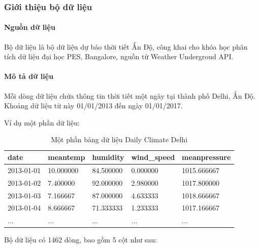 \subsubsection{Giới thiệu bộ dữ liệu}
    \paragraph{Nguồn dữ liệu}
    \leavevmode

    Bộ dữ liệu là bộ dữ liệu dự báo thời tiết Ấn Độ, công khai cho khóa học phân tích dữ liệu đại học PES, Bangalore, nguồn từ Weather Undergroud API. 

    \paragraph{Mô tả dữ liệu}
    \leavevmode
    Mỗi dòng dữ liệu chứa thông tin thời tiết một ngày tại thành phố Delhi, Ấn Độ. Khoảng dữ liệu từ này 01/01/2013 đến ngày 01/01/2017.

    Ví dụ một phần dữ liệu:

    \begin{table}[htbp]
    \centering
    \caption{Một phần bảng dữ liệu Daily Climate Delhi}
    \label{tab:stat-weather-exp}
        \begin{tabular}{|p{2cm}|p{2cm}|p{2cm}|p{2.3cm}|p{3cm}|}
        \hline
        date & meantemp & humidity & wind\_speed & meanpressure \\
        \hline
        2013-01-01 & 10.000000 & 84.500000 & 0.000000 & 1015.666667 \\
        \hline
        2013-01-02 & 7.400000 & 92.000000 & 2.980000 & 1017.800000 \\
        \hline
        2013-01-03 & 7.166667 & 87.000000 & 4.633333 & 1018.666667 \\
        \hline
        2013-01-04 & 8.666667 & 71.333333 & 1.233333 & 1017.166667 \\
        \hline
        ... & ... & ... & ... & ... \\
        \hline
        \end{tabular}

    \end{table}

    Bộ dữ liệu có 1462 dòng, bao gồm 5 cột như sau:

